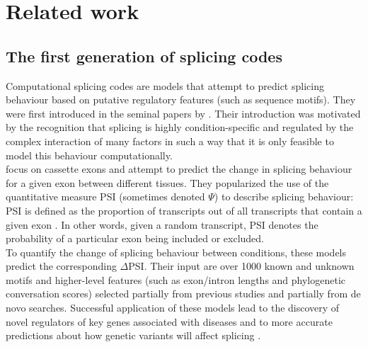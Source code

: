 \chapter{\label{ch:3-relatedwork}Related work} %
\section{The first generation of splicing codes}
Computational splicing codes are models that attempt to predict splicing behaviour based on putative regulatory features (such as sequence motifs).
They were first introduced in the seminal papers by \cite{barash2010a}\cite{barash2010b}. Their introduction was motivated by the recognition that splicing is highly condition-specific and regulated by the complex interaction of many factors in such a way that it is only feasible to model this behaviour computationally.\\
\cite{barash2010a} focus on cassette exons and attempt to predict the change in splicing behaviour for a given exon between different tissues. They popularized the use of the quantitative measure PSI (sometimes denoted $\Psi$) to describe splicing behaviour:
PSI is defined as the proportion of transcripts out of all transcripts that contain a given exon \cite{psi}. In other words, given a random transcript, PSI denotes the probability of a particular exon being included or excluded.\\
To quantify the change of splicing behaviour between conditions, these models predict the corresponding $\Delta$PSI. Their input are over 1000 known and unknown motifs and higher-level features (such as exon/intron lengths and phylogenetic conversation scores) selected partially from previous studies and partially from de novo searches. Successful application of these models lead to the discovery of novel regulators of key genes associated with diseases and to more accurate predictions about how genetic variants will affect splicing \cite{splicingcodegood1} \cite{splicingcodegood2}. 

